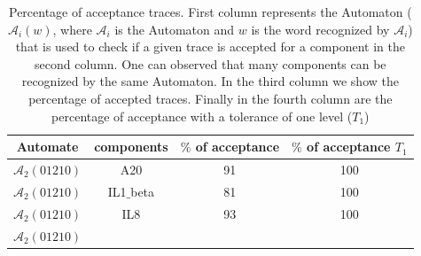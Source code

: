 \begin{table}[!t]
\renewcommand{\arraystretch}{1.3}


\caption{Percentage of acceptance traces. First column represents the Automaton ($\mathcal{A}_{i}(w)$, where $\mathcal{A}_{i}$ is the Automaton and $w$ is the word recognized by $\mathcal{A}_{i}$) 
that is used to check if a given trace is accepted for a component in the second 
column. One can observed that many components can be recognized by the same Automaton. In the third column we show the percentage of accepted traces. Finally in the fourth column
are the percentage of acceptance with a tolerance of one level ($T_{1}$)}


\label{traceAnalysis}
\centering
\begin{tabular}{|c|c||c|c|}
\hline

\textbf{Automate}

&

\textbf{components}

&

\textbf{$\%$ of acceptance}

&

\textbf{$\%$ of acceptance $T_{1}$}
\\ \hline

$\mathcal{A}_{2}(01210)$

&

A20

&

91

&

100
\\ \hline

$\mathcal{A}_{2}(01210)$

&

IL1$\_$beta

&

81

&

100
\\ \hline

$\mathcal{A}_{2}(01210)$

&

IL8

&

93

&

100

\\ \hline

$\mathcal{A}_{2}(01210)$

&


\end{tabular}
\end{table}
